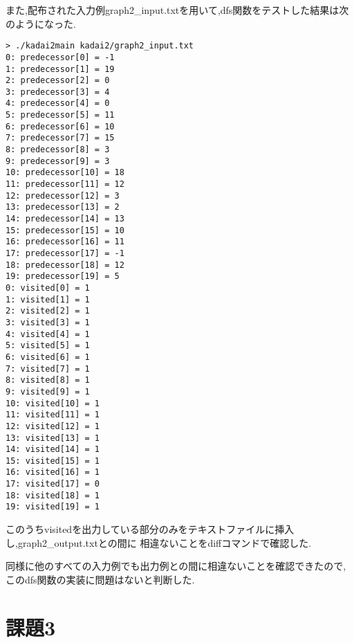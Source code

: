 \documentclass[autodetect-engine, dvi=dvipdfmx, 10pt, a4paper, ja=standard]{bxjsarticle}
\begin{document}
また,配布された入力例graph2\_input.txtを用いて,dfs関数をテストした結果は次のようになった.

\begin{verbatim}
> ./kadai2main kadai2/graph2_input.txt
0: predecessor[0] = -1
1: predecessor[1] = 19
2: predecessor[2] = 0
3: predecessor[3] = 4
4: predecessor[4] = 0
5: predecessor[5] = 11
6: predecessor[6] = 10
7: predecessor[7] = 15
8: predecessor[8] = 3
9: predecessor[9] = 3
10: predecessor[10] = 18
11: predecessor[11] = 12
12: predecessor[12] = 3
13: predecessor[13] = 2
14: predecessor[14] = 13
15: predecessor[15] = 10
16: predecessor[16] = 11
17: predecessor[17] = -1
18: predecessor[18] = 12
19: predecessor[19] = 5
0: visited[0] = 1
1: visited[1] = 1
2: visited[2] = 1
3: visited[3] = 1
4: visited[4] = 1
5: visited[5] = 1
6: visited[6] = 1
7: visited[7] = 1
8: visited[8] = 1
9: visited[9] = 1
10: visited[10] = 1
11: visited[11] = 1
12: visited[12] = 1
13: visited[13] = 1
14: visited[14] = 1
15: visited[15] = 1
16: visited[16] = 1
17: visited[17] = 0
18: visited[18] = 1
19: visited[19] = 1
\end{verbatim}

このうちvisitedを出力している部分のみをテキストファイルに挿入し,graph2\_output.txtとの間に
相違ないことをdiffコマンドで確認した.

同様に他のすべての入力例でも出力例との間に相違ないことを確認できたので,このdfs関数の実装に問題はないと判断した.

\section{課題3}


\end{document}

